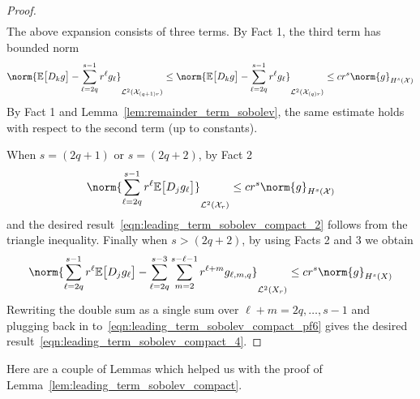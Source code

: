 \documentclass{article}
\newcommand{\1}{\mathbf{1}}
\newcommand{\Xset}{\mathcal{X}}
\newcommand{\Leb}{\mathcal{L}}
\newcommand{\Ebb}{\mathbb{E}}
\theoremstyle{alden}
\theoremstyle{aldenthm}
\theoremstyle{definition}
\theoremstyle{remark}
\begin{document}
\begin{proof}
\begin{align}
	\end{align}
	The above expansion consists of three terms. By Fact 1, the third term has bounded norm
	\begin{equation*}
	\norm{\Ebb\bigl[D_kg\bigr] - \sum_{\ell = 2q}^{s - 1}r^{\ell} g_{\ell}}_{\Leb^2(\Xset_{(q + 1)r})} \leq \norm{\Ebb\bigl[D_kg\bigr] - \sum_{\ell = 2q}^{s - 1}r^{\ell} g_{\ell}}_{\Leb^2(\Xset_{(q)r})} \leq c r^{s} \norm{g}_{H^s(\Xset)}
	\end{equation*}
	By Fact 1 and Lemma~\ref{lem:remainder_term_sobolev}, the same estimate holds with respect to the second term (up to constants). 
	
	When $s = (2q + 1)$ or $s = (2q + 2)$, by Fact 2
	\begin{equation*}
	\norm{ \sum_{\ell = 2q}^{s - 1} r^{\ell} \Ebb\bigl[D_jg_{\ell}\bigr]}_{\Leb^2(\Xset_r)} \leq c r^s \norm{g}_{H^s(\Xset)}
	\end{equation*}
	and the desired result~\eqref{eqn:leading_term_sobolev_compact_2} follows from the triangle inequality. Finally when $s > (2q + 2)$, by using Facts 2 and 3 we obtain
	\begin{align*}
	\norm{\sum_{\ell = 2q}^{s - 1} r^{\ell} \Ebb\bigl[D_jg_{\ell}\bigr] - \sum_{\ell = 2q}^{s - 3} \sum_{m = 2}^{s - \ell - 1} r^{\ell + m} g_{\ell,m,q}}_{\Leb^2(X_r)} \leq cr^s \norm{g}_{H^s(X)}
	\end{align*}
	Rewriting the double sum as a single sum over $\ell + m = 2q,\ldots,s - 1$ and plugging back in to~\eqref{eqn:leading_term_sobolev_compact_pf6} gives the desired result~\eqref{eqn:leading_term_sobolev_compact_4}.
\end{proof}

Here are a couple of Lemmas which helped us with the proof of Lemma~\ref{lem:leading_term_sobolev_compact}.
\end{document}
